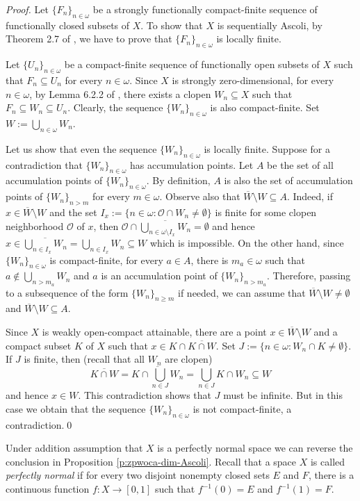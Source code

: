 \documentclass[preprint,11pt]{elsarticle}
\numberwithin{equation}{section}
\numberwithin{theorem}{section}
\newcommand{\w}{\omega}
\newcommand{\SM}{{\setminus}}
\begin{document}
\begin{proof}
Let $\{F_n\}_{n\in\w}$ be a strongly functionally compact-finite sequence of functionally closed subsets of $X$. To show that $X$ is sequentially Ascoli, by Theorem 2.7 of \cite{Gabr-seq-Ascoli}, we have  to prove that  $\{F_n\}_{n\in\w}$  is locally finite.

Let $\{U_n\}_{n\in\w}$  be a compact-finite sequence of functionally open subsets of $X$ such that $F_n\subseteq U_n$ for every $n\in\w$.
Since $X$ is strongly zero-dimensional, for every $n\in\w$, by Lemma 6.2.2 of \cite{Eng},  there exists a clopen $W_n\subseteq X$ such that $F_n\subseteq W_n \subseteq  U_n$. Clearly,  the sequence $\{W_n\}_{n\in\w}$  is also compact-finite. Set $W:=\bigcup_{n\in\w} W_n$.

Let us show that even the sequence $\{W_n\}_{n\in\w}$  is locally finite. Suppose for a contradiction that $\{W_n\}_{n\in\w}$  has accumulation points. Let $A$ be the set of all  accumulation points of $\{W_n\}_{n\in\w}$. By definition, $A$ is also the set of accumulation points of $\{W_n\}_{n> m}$ for every $m\in\w$. Observe also that $\overline{W}\SM W\subseteq A$. Indeed, if  $x\in \overline{W}\SM W$ and the set $I_x:=\{n\in\w: \mathcal{O}\cap W_n\not=\emptyset\}$ is finite for some clopen neighborhood $\mathcal{O}$ of $x$, then $\mathcal{O}\cap \overline{\bigcup_{n\in \w\SM I_x} W_n}=\emptyset$ and hence $x\in \overline{\bigcup_{n\in I_x} W_n}=\bigcup_{n\in I_x} W_n\subseteq W$ which is impossible. On the other hand, since $\{W_n\}_{n\in\w}$  is compact-finite, for every $a\in A$, there is $m_a\in\w$ such that $a\not\in \bigcup_{n> m_a} W_n$ and $a$ is an accumulation point of $\{W_n\}_{n> m_a}$. Therefore, passing to a subsequence of the form  $\{W_n\}_{n\geq m}$ if needed, we can assume that $\overline{W}\SM W\not=\emptyset$ and $\overline{W}\SM W\subseteq A$.

Since $X$ is weakly open-compact attainable, there are a point $x\in \overline{W}\SM W$  and a compact subset $K$ of $X$ such that $x\in K\cap \overline{K\cap W}$. Set $J:=\{n\in \w: W_n\cap K\neq\emptyset\}$. If $J$ is finite, then (recall that all $W_n$ are clopen)
\[
\overline{K\cap W}=\overline{K\cap \bigcup_{n\in J} W_n}=  \bigcup_{n\in J} K\cap W_n \subseteq W
\]
and hence $x\in W$. This contradiction shows that $J$ must be infinite. But in this case we obtain that the sequence  $\{W_n\}_{n\in\w}$  is not compact-finite, a contradiction.\qed
\end{proof}

Under addition assumption that $X$ is a perfectly normal space we can reverse the conclusion in Proposition \ref{p:zpwoca-dim-Ascoli}.
Recall that a space $X$ is called {\em perfectly normal} if for every two disjoint nonempty closed sets $E$ and $F$, there is a continuous function $f:X\to[0,1]$ such that $f^{-1}(0)=E$ and $f^{-1}(1)=F$.
\end{document}
